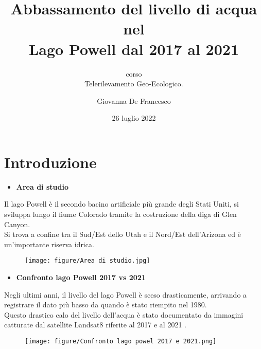 \documentclass[10pt]{beamer}
\title{Abbassamento del livello di acqua nel
              \\Lago Powell dal 2017 al 2021}
\subtitle {\footnotesize corso \\ Telerilevamento Geo-Ecologico.}
\author{Giovanna De Francesco}
\institute {Alma Mater Studiorum University of Bologna\\ 
  \bigskip
  \texttt{[image: figure/logo\_unibo.png]}}
\date{26 luglio 2022}
\begin{document}
   \maketitle


\section {Introduzione}
\begin{frame} 
    \begin{itemize}
      \item \textbf{Area di studio}
    \end{itemize}
            {\scriptsize Il lago Powell è il secondo bacino artificiale più grande degli Stati Uniti, si sviluppa lungo il fiume Colorado tramite la costruzione della diga di Glen Canyon.
            \\Si trova a confine tra il Sud/Est dello Utah e il Nord/Est dell’Arizona ed è un'importante riserva idrica.\par}
    \begin{figure}
      \centering
      \texttt{[image: figure/Area di studio.jpg]}
    \end{figure}
\end{frame}


\begin{frame} 
    \begin{itemize}
      \item \textbf{Confronto lago Powell 2017 vs 2021}
    \end{itemize}
            {\scriptsize Negli ultimi anni, il livello del lago Powell è sceso drasticamente, arrivando a registrare il dato più basso da quando è stato riempito nel 1980. 
            \\Questo drastico calo del livello dell’acqua è  stato documentato da immagini catturate dal satellite Landsat8 riferite al 2017 e al 2021 .\par}
            \bigskip 
    \begin{figure}
      \centering
      \texttt{[image: figure/Confronto lago powel 2017 e 2021.png]}
    \end{figure}
\end{frame}
\end{document}
